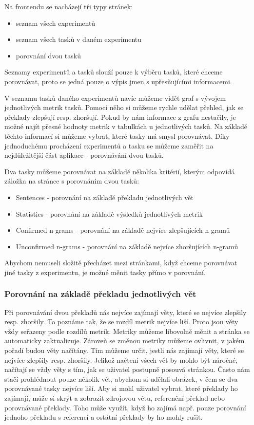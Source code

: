 Na frontendu se nacházejí tři typy stránek:
\begin{itemize}
  \item seznam všech experimentů
  \item seznam všech tasků v daném experimentu
  \item porovnání dvou tasků
\end{itemize}

Seznamy experimentů a tasků slouží pouze k výběru tasků,
  které chceme porovnávat,
  proto se jedná pouze o výpis jmen s upřesňujícími informacemi.

V seznamu tasků daného experimentů navíc můžeme vidět graf s vývojem jednotlivých metrik tasků.
Pomocí něho si můžeme rychle udělat přehled,
  jak se překlady zlepšují resp. zhoršují.
Pokud by nám informace z grafu nestačily,
  je možné najít přesné hodnoty metrik v tabulkách u jednotlivých tasků.
Na základě těchto informací si můžeme vybrat,
  které tasky má smysl porovnávat.
Díky jednoduchému procházení experimentů a tasku se můžeme zaměřit na nejdůležitější část aplikace
  - porovnávání dvou tasků.

Dva tasky můžeme porovnávat na základě několika kritérií,
  kterým odpovídá záložka na stránce s porovnáním dvou tasků:
\begin{itemize}
  \item Sentences - porovnání na základě překladu jednotlivých vět
  \item Statistics - porovnání na základě výsledků jednotlivých metrik
  \item Confirmed n-grams - porovnání na základě nejvíce zlepšujících n-gramů
  \item Unconfirmed n-grams - porovnání na základě nejvíce zhoršujících n-gramů
\end{itemize}

Abychom nemuseli složitě přecházet mezi stránkami,
  když chceme porovnávat jiné tasky z experimentu,
  je možné měnit tasky přímo v porovnání.


\subsubsection{Porovnání na základě překladu jednotlivých vět}
Při porovnávání dvou překladů nás nejvíce zajímají věty,
  které se nejvíce zlepšily resp. zhoršily.
To poznáme tak, že se rozdíl metrik nejvíce liší. 
Proto jsou věty vždy seřazeny podle rozdílů metrik.
Metriky můžeme libovolně měnit a stránka se automaticky zaktualizuje.
Zároveň se změnou metriky můžeme ovlivnit,
  v jakém pořadí budou věty načítány.
Tím můžeme určit,
  jestli nás zajímají věty,
  které se nejvíce zlepšily resp. zhoršily.
Jelikož načtení všech vět by mohlo být náročné,
  načítají se vždy věty s tím,
  jak se uživatel postupně posouvá stránkou.
Často nám stačí prohlédnout pouze několik vět,
  abychom si udělali obrázek,
  v čem se dva porovnávané tasky nejvíce liší.
Aby si mohl uživatel vybrat,
  které překlady ho zajímají,
  může si skrýt a zobrazit zdrojovou větu, referenční překlad nebo porovnávané překlady.
Toho může využít, když ho zajímá např. pouze porovnání jednoho překladu s referencí a
  ostátní překlady by ho mohly rušit.

